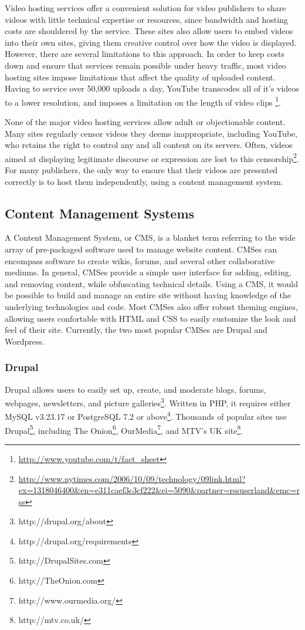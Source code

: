 \documentclass[a4paper,12pt]{report}
\begin{document}
Video hosting services offer a convenient solution for video publishers 
to share videos with little technical expertise or resources, since bandwidth and hosting costs are shouldered by the service. These sites also allow users to embed videos into their own sites, giving them creative control over how the video is displayed. However, there are several limitations to this approach. In order to keep costs down and ensure that services remain possible under heavy traffic, most video hosting sites impose limitations that affect the quality of uploaded content. Having to service over 50,000 uploads a day, YouTube transcodes all of it's videos to a lower resolution, and imposes a limitation on the length of video clips \footnote{\url{http://www.youtube.com/t/fact\_sheet}}. 

None of the major video hosting services allow adult or objectionable content.
Many sites regularly censor videos they deems inappropriate, including YouTube, who retains the right to control any and all content on its servers.
Often, videos aimed at displaying legitimate discourse or expression are lost to this censorship\footnote{\url{http://www.nytimes.com/2006/10/09/technology/09link.html?ex=1318046400&en=e311caef3c3cf222&ei=5090&partner=rssuserland&emc=rss}}.
For many publishers, the only way to ensure that their videos are presented correctly is to host them independently, using a content management system.

\subsection{Content Management Systems}

A Content Management System, or CMS, is a blanket term referring to the wide array of pre-packaged software used to manage website content. CMSes can encompass software to create wikis, forums, and several other collaborative mediums. In general, CMSes provide a simple user interface for adding, editing, and removing content, while obfuscating technical details. Using a CMS, it would be possible to build and manage an entire site without having knowledge of the underlying technologies and code. Most CMSes also offer robust theming engines, allowing users confortable with HTML and CSS to easily customize the look and feel of their site. Currently, the two most popular CMSes are Drupal and Wordpress.

\subsubsection{Drupal}
Drupal allows users to easily set up, create, and moderate blogs, forums, webpages, newsletters, and picture galleries\footnote{http://drupal.org/about}.
Written in PHP, it requires either MySQL v3.23.17 or PostgreSQL 7.2 or above\footnote{http://drupal.org/requirements}.
Thousands of popular sites use Drupal\footnote{http://DrupalSites.com}, including The Onion\footnote{ http://TheOnion.com}, OurMedia\footnote{http://www.ourmedia.org/}, and MTV's UK site\footnote{http://mtv.co.uk/}.
\end{document}
